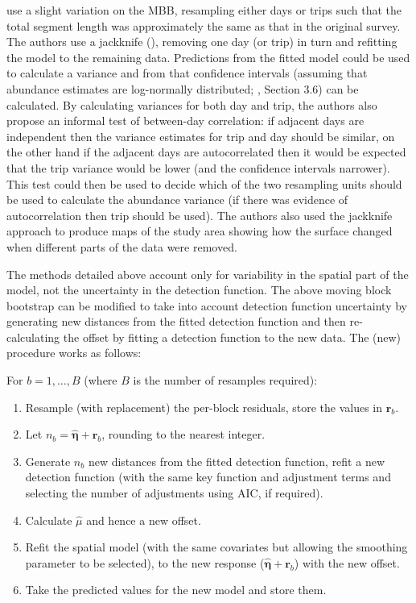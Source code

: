 \documentclass[a4paper,12pt]{article}
\begin{document}
\cite{Williams:2006tz} use a slight variation on the MBB, resampling either days or trips such that the total segment length was approximately the same as that in the original survey. The authors use a jackknife (\cite{Efron:1979ha}), removing one day (or trip) in turn and refitting the model to the remaining data. Predictions from the fitted model could be used to calculate a variance and from that confidence intervals (assuming that abundance estimates are log-normally distributed; \cite{Buckland:2001vm}, Section 3.6) can be calculated. By calculating variances for both day and trip, the authors also propose an informal test of between-day correlation: if adjacent days are independent then the variance estimates for trip and day should be similar, on the other hand if the adjacent days are autocorrelated then it would be expected that the trip variance would be lower (and the confidence intervals narrower). This test could then be used to decide which of the two resampling units should be used to calculate the abundance variance (if there was evidence of autocorrelation then trip should be used). The authors also used the jackknife approach to produce maps of the study area showing how the surface changed when different parts of the data were removed.

The methods detailed above account only for variability in the spatial part of the model, not the uncertainty in the detection function. The above moving block bootstrap can be modified to take into account detection function uncertainty by generating new distances from the fitted detection function and then re-calculating the offset by fitting a detection function to the new data. The (new) procedure works as follows:

For $b=1,\ldots,B$ (where $B$ is the number of resamples required):
\begin{enumerate}
	\item Resample (with replacement) the per-block residuals, store the values in $\mathbf{r}_{b}$.
	\item Let $n_b=\hat{\bm{\eta}}+\mathbf{r}_{b}$, rounding to the nearest integer.
	\item Generate $n_b$ new distances from the fitted detection function, refit a new detection function (with the same key function and adjustment terms and selecting the number of adjustments using AIC, if required).
	\item Calculate $\hat{\mu}$ and hence a new offset.
	\item Refit the spatial model (with the same covariates but allowing the smoothing parameter to be selected), to the new response ($\hat{\bm{\eta}}+\mathbf{r}_{b}$) with the new offset.
	\item Take the predicted values for the new model and store them.
\end{enumerate}
\end{document}
